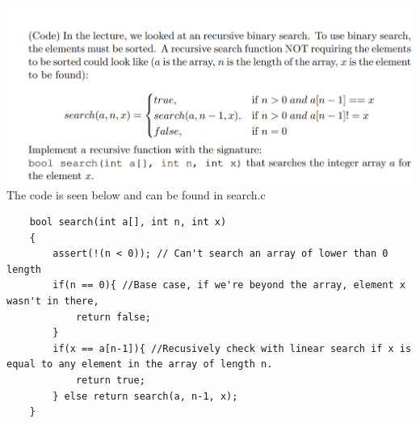 \documentclass{article}
\begin{document}
\section{}
\includegraphics[width=\linewidth, keepaspectratio=true]{task3} 
The code is seen below and can be found in search.c
\begin{lstlisting}
    bool search(int a[], int n, int x)
    {
        assert(!(n < 0)); // Can't search an array of lower than 0 length
        if(n == 0){ //Base case, if we're beyond the array, element x wasn't in there,
            return false;
        }
        if(x == a[n-1]){ //Recusively check with linear search if x is equal to any element in the array of length n.
            return true;
        } else return search(a, n-1, x);
    }
\end{lstlisting}
\vspace{1cm}

\pagebreak
\end{document}
